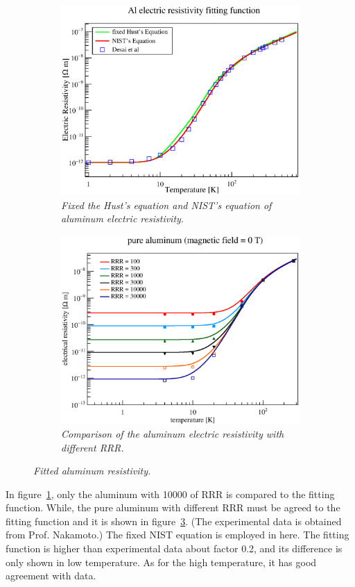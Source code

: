   \begin{figure}[H]
   \begin{subfigure}{3.1in}
	\centering
    \includegraphics[scale=0.45]{chapter5/fig/alres1.eps}
	\caption{\it Fixed the Hust's equation and NIST's equation of aluminum electric resistivity.}
    \label{4alres}
   \end{subfigure}
   \quad
   \begin{subfigure}{3.1in}
    \centering
    \includegraphics[scale=0.45]{chapter5/fig/resist.eps}
	\caption{\it Comparison of the aluminum electric resistivity with different RRR.}
    \label{4alres2}
   \end{subfigure}
   \caption{\it Fitted aluminum resistivity.}
  \end{figure}
In figure~\ref{4alres}, only the aluminum with 10000 of RRR is compared to the fitting function.
While, the pure aluminum with different RRR must be agreed to the fitting function and it is shown in figure~\ref{4alres2}.
(The experimental data is obtained from Prof. Nakamoto.)
The fixed NIST equation is employed in here.
The fitting function is higher than experimental data about factor 0.2, and its difference is only shown in low temperature.
As for the high temperature, it has good agreement with data.


